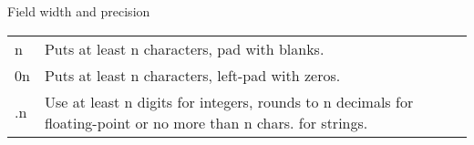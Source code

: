 \hangpar \textsf{Field width} and \textsf{precision}\\
\begin{tabular}{@{}lp{}}
\textsf{n} & Puts at least \textsf{n} characters, pad with blanks. \\
\textsf{0n} & Puts at least \textsf{n} characters, left-pad with zeros. \\
\textsf{.n} & Use at least \textsf{n} digits for integers, rounds to \textsf{n} decimals for floating-point or no more than \textsf{n} chars. for strings. \\
\end{tabular}
